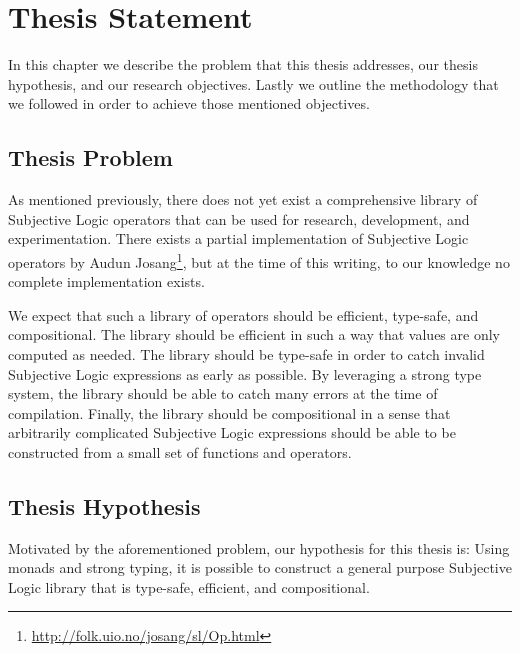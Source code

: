 \documentclass[thesis.tex]{subfiles}
\begin{document}
\chapter{Thesis Statement}
\label{chap:thesis-statement}

In this chapter we describe the problem that this thesis addresses, our thesis hypothesis, and
our research objectives. Lastly we outline the methodology that we followed in order to achieve
those mentioned objectives.



\section{Thesis Problem}

%
%

As mentioned previously, there does not yet exist a comprehensive library of Subjective
Logic operators that can be used for research, development, and experimentation. There
exists a partial implementation of Subjective Logic operators by Audun Josang\footnote{\url{http://folk.uio.no/josang/sl/Op.html}},
but at the time of this writing, to our knowledge no complete implementation exists.

We expect that such a library of operators should be efficient, type-safe, and compositional.
The library should be efficient in such a way that values are only computed as needed. The
library should be type-safe in order to catch invalid Subjective Logic expressions as early as
possible. By leveraging a strong type system, the library should be able to catch many errors
at the time of compilation. Finally, the library should be compositional in a sense that
arbitrarily complicated Subjective Logic expressions should be able to be constructed from a
small set of functions and operators.


\section{Thesis Hypothesis}

Motivated by the aforementioned problem, our hypothesis for this thesis is: Using monads and strong typing, it is
possible to construct a general purpose Subjective Logic library that is type-safe, efficient,
and compositional.




%
%
\end{document}
